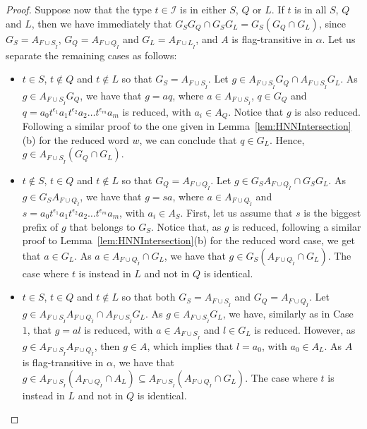 \documentclass[11pt,letterpaper]{amsart}
\newcommand{\II}{\mathcal{I}}
\begin{document}
\begin{proof}
    Suppose now that the type $t\in \II$ is in either $S$, $Q$ or $L$. If $t$ is in all $S$, $Q$ and $L$, then we have immediately that $G_SG_Q \cap G_SG_L = G_S(G_Q\cap G_L)$, since $G_S=A_{F\cup S_{\widetilde{I}}}$, $G_Q=A_{F\cup Q_{\widetilde{I}}}$ and $G_L=A_{F\cup L_{\widetilde{I}}}$, and $A$ is flag-transitive in $\alpha$. Let us separate the remaining cases as follows:
    \begin{itemize}
        \item[Case 1:] $t\in S$, $t\notin Q$ and $t\notin L$ so that $G_S=A_{F\cup S_{\widetilde{I}}}$. Let $g \in A_{F\cup S_{\widetilde{I}}}G_Q\cap A_{F\cup S_{\widetilde{I}}} G_L$. As $g\in A_{F\cup S_{\widetilde{I}}}G_Q$, we have that $g= a q$, where $a\in A_{F\cup S_{\widetilde{I}}}$, $q\in G_Q$ and $q=a_0 t^{\epsilon_1}a_1t^{\epsilon_2}a_2\ldots t^{\epsilon_m}a_m$ is reduced, with $a_i\in A_{Q}$. Notice that $g$ is also reduced. Following a similar proof to the one given in Lemma~\ref{lem:HNNIntersection}(b) for the reduced word $w$, we can conclude that $q\in G_L$. Hence, $g\in A_{F\cup S_{\widetilde{I}}}(G_Q\cap G_L)$.
    \item[Case 2:] $t\notin S$, $t\in Q$ and $t\notin L$ so that $G_Q=A_{F\cup Q_{\widetilde{I}}}$. Let $g\in G_S A_{F\cup Q_{\widetilde{I}}}\cap G_SG_L$. As $g\in G_S A_{F\cup Q_{\widetilde{I}}}$, we have that $g=sa$, where $a\in A_{F\cup Q_{\widetilde{I}}}$ and $s=a_0 t^{\epsilon_1}a_1t^{\epsilon_2}a_2\ldots t^{\epsilon_m}a_m$, with $a_i\in A_S$. First, let us assume that $s$ is the biggest prefix of $g$ that belongs to $G_S$. Notice that, as $g$ is reduced, following a similar proof to Lemma~\ref{lem:HNNIntersection}(b) for the reduced word case, we get that $a\in G_L$. As $a\in A_{F\cup Q_{\widetilde{I}}}\cap G_L$, we have that $g\in G_S(A_{F\cup Q_{\widetilde{I}}}\cap G_L)$. The case where $t$ is instead in $L$ and not in $Q$ is identical.
    \item[Case 3:] $t\in S$, $t\in Q$ and $t\notin L$ so that both  $G_S=A_{F\cup S_{\widetilde{I}}}$ and $G_Q=A_{F\cup Q_{\widetilde{I}}}$.
        Let $g \in A_{F\cup S_{\widetilde{I}}} A_{F\cup Q_{\widetilde{I}}}\cap A_{F\cup S_{\widetilde{I}}}G_L$.
        As $g\in A_{F\cup S_{\widetilde{I}}}G_L$, we have, similarly as in Case $1$, that $g=al$ is reduced, with $a\in A_{F\cup S_{\widetilde{I}}}$ and $l\in G_L$ is reduced.
        However, as $g\in A_{F\cup S_{\widetilde{I}}} A_{F\cup Q_{\widetilde{I}}}$, then $g\in A$, which implies that $l=a_0$, with $a_0\in A_L$. As $A$ is flag-transitive in $\alpha$, we have that $g\in A_{F\cup S_{\widetilde{I}}}(A_{F\cup Q_{\widetilde{I}}}\cap A_L)\subseteq A_{F\cup S_{\widetilde{I}}}(A_{F\cup Q_{\widetilde{I}}}\cap G_L)$. The case where $t$ is instead in $L$ and not in $Q$ is identical.
        

\end{itemize}
\end{proof}
\end{document}
